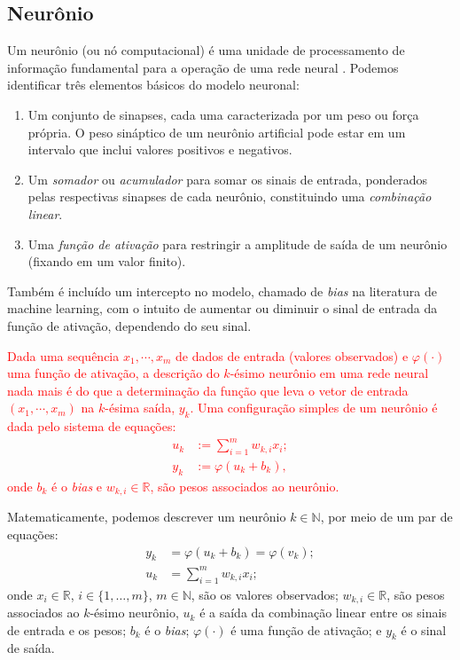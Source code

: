 \documentclass{automatextcc}
\newcommand{\pumi}[1]{\textcolor{red}{#1}}
\newcommand{\R}{\mathds{R}}
\newcommand{\N}{\mathds{N}}
\begin{document}
\subsection{Neurônio}
Um neurônio (ou nó computacional) é uma unidade de processamento de informação fundamental para a operação de uma rede neural \citep{haykin2008}. Podemos identificar três elementos básicos do modelo neuronal:
\begin{enumerate}
    \item Um conjunto de sinapses, cada uma caracterizada por um peso ou força própria. O peso sináptico de um neurônio artificial pode estar em um intervalo que inclui valores positivos e negativos.
    \item Um \textit{somador} ou \textit{acumulador} para somar os sinais de entrada, ponderados pelas respectivas sinapses de cada neurônio, constituindo uma \textit{combinação linear}.
    \item Uma \textit{função de ativação} para restringir a amplitude de saída de um neurônio (fixando em um valor finito).
\end{enumerate}
Também é incluído um intercepto  no modelo, chamado de \textit{bias} na literatura de machine learning, com o intuito de aumentar ou diminuir o sinal de entrada da função de ativação, dependendo do seu sinal.

\pumi{Dada uma sequência $x_1,\cdots,x_m$ de dados de entrada (valores observados) e $\varphi(\cdot)$ uma função de ativação, a descrição do $k$-ésimo neurônio em uma rede neural nada mais é do que a determinação da função que leva o vetor de entrada $(x_1,\cdots,x_m)$ na $k$-ésima saída, $y_k$. Uma configuração simples de um neurônio é dada pelo sistema de equações:
\begin{align*}
    u_k & := \sum_{i=1}^{m} w_{k,i}x_i;\\   
    y_k &:= \varphi(u_k + b_k),
\end{align*}
onde $b_k$ é o \textit{bias} e $w_{k,i} \in \R$, são pesos associados ao neurônio.}


Matematicamente, podemos descrever um neurônio $k \in \N$, por meio de um par de equações:
\begin{align*}
    y_k &= \varphi(u_k + b_k) = \varphi(v_k);\\[.2cm]
    u_k &= \displaystyle{\sum_{i=1}^{m} }w_{k,i}x_i;
\end{align*}
onde $x_i \in \R$, $i \in \{1,\dots,m\}$, $m \in \N$, são os valores observados; $w_{k,i} \in \R$, são  pesos associados ao $k$-ésimo neurônio, $u_k$ é a saída da combinação linear entre os sinais de entrada e os pesos; $b_k$ é o \textit{bias}; $\varphi(\cdot)$ é uma função de ativação; e $y_k$ é o sinal de saída.
\end{document}
